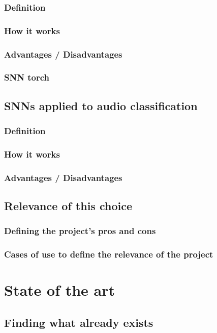 \documentclass{article}
\begin{document}
\subsubsection{Definition}
\subsubsection{How it works}
\subsubsection{Advantages / Disadvantages}
\subsubsection{SNN torch}
\subsection{SNNs applied to audio classification}
\subsubsection{Definition}
\subsubsection{How it works}
\subsubsection{Advantages / Disadvantages}
\subsection{Relevance of this choice}
\subsubsection{Defining the project's pros and cons}
\subsubsection{Cases of use to define the relevance of the project}

\section{State of the art}
\subsection{Finding what already exists}
\end{document}

